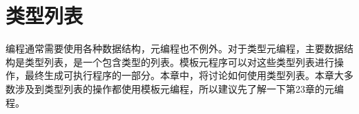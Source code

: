 \chapter{类型列表}
编程通常需要使用各种数据结构，元编程也不例外。对于类型元编程，主要数据结构是类型列表，是一个包含类型的列表。模板元程序可以对这些类型列表进行操作，最终生成可执行程序的一部分。本章中，将讨论如何使用类型列表。本章大多数涉及到类型列表的操作都使用模板元编程，所以建议先了解一下第23章的元编程。





